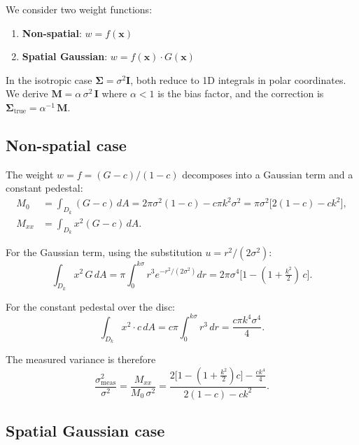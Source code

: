 \documentclass[11pt]{article}
\newcommand{\vect}[1]{\mathbf{#1}}
\newcommand{\mat}[1]{\mathbf{#1}}
\begin{document}
We consider two weight functions:
\begin{enumerate}
  \item \textbf{Non-spatial}: $w = f(\vect{x})$
  \item \textbf{Spatial Gaussian}: $w = f(\vect{x}) \cdot G(\vect{x})$
\end{enumerate}

In the isotropic case $\mat{\Sigma} = \sigma^2\mat{I}$, both reduce to 1D
integrals in polar coordinates. We derive
$\mat{M} = \alpha\,\sigma^2\,\mat{I}$ where $\alpha < 1$ is the bias factor,
and the correction is $\mat{\Sigma}_\text{true} = \alpha^{-1}\,\mat{M}$.

\subsection{Non-spatial case}

The weight $w = f = (G - c)/(1-c)$ decomposes into a Gaussian term and a
constant pedestal:
\begin{align}
  M_0 &= \int_{D_k} (G - c)\,dA = 2\pi\sigma^2(1-c) - c\pi k^2\sigma^2
       = \pi\sigma^2\bigl[2(1-c) - ck^2\bigr], \\[4pt]
  M_{xx} &= \int_{D_k} x^2(G - c)\,dA.
\end{align}

For the Gaussian term, using the substitution $u = r^2/(2\sigma^2)$:
\begin{equation}
  \int_{D_k} x^2\,G\,dA
    = \pi\!\int_0^{k\sigma}\!r^3 e^{-r^2/(2\sigma^2)}dr
    = 2\pi\sigma^4\bigl[1 - (1 + \tfrac{k^2}{2})\,c\bigr].
\end{equation}

For the constant pedestal over the disc:
\begin{equation}
  \int_{D_k} x^2\cdot c\,dA
    = c\pi\!\int_0^{k\sigma}\!r^3\,dr
    = \frac{c\pi k^4\sigma^4}{4}.
\end{equation}

The measured variance is therefore
\begin{equation}\label{eq:nonspatial}
  \boxed{
  \frac{\sigma^2_\text{meas}}{\sigma^2}
  = \frac{M_{xx}}{M_0\,\sigma^2}
  = \frac{2\bigl[1-(1+\frac{k^2}{2})c\bigr] - \frac{ck^4}{4}}
         {2(1-c) - ck^2}.
  }
\end{equation}

\subsection{Spatial Gaussian case}
\end{document}
